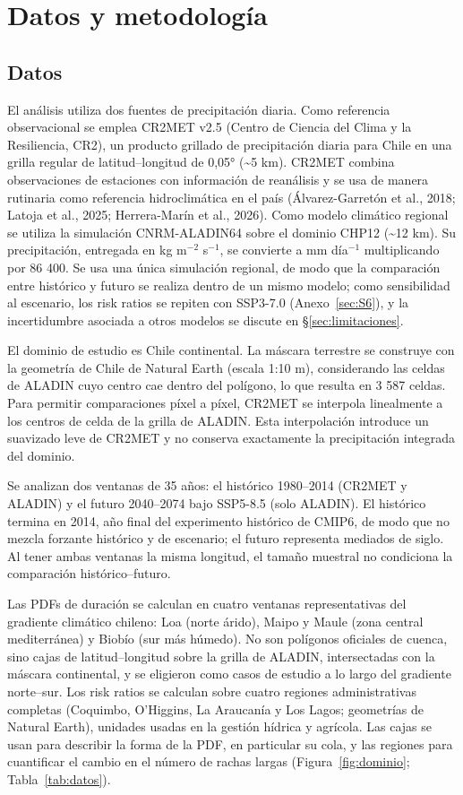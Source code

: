 \chapter{Datos y metodología}\label{cap:3}

\section{Datos}\label{sec:datos}

El análisis utiliza dos fuentes de precipitación diaria. Como referencia observacional se emplea CR2MET v2.5 (Centro de Ciencia del Clima y la Resiliencia, CR2), un producto grillado de precipitación diaria para Chile en una grilla regular de latitud--longitud de 0,05° (\textasciitilde5 km). CR2MET combina observaciones de estaciones con información de reanálisis y se usa de manera rutinaria como referencia hidroclimática en el país (Álvarez-Garretón et al., 2018; Latoja et al., 2025; Herrera-Marín et al., 2026). Como modelo climático regional se utiliza la simulación CNRM-ALADIN64 sobre el dominio CHP12 (\textasciitilde12 km). Su precipitación, entregada en kg m$^{-2}$ s$^{-1}$, se convierte a mm día$^{-1}$ multiplicando por 86 400. Se usa una única simulación regional, de modo que la comparación entre histórico y futuro se realiza dentro de un mismo modelo; como sensibilidad al escenario, los risk ratios se repiten con SSP3-7.0 (Anexo~\ref{sec:S6}), y la incertidumbre asociada a otros modelos se discute en §\ref{sec:limitaciones}.

El dominio de estudio es Chile continental. La máscara terrestre se construye con la geometría de Chile de Natural Earth (escala 1:10 m), considerando las celdas de ALADIN cuyo centro cae dentro del polígono, lo que resulta en 3 587 celdas. Para permitir comparaciones píxel a píxel, CR2MET se interpola linealmente a los centros de celda de la grilla de ALADIN. Esta interpolación introduce un suavizado leve de CR2MET y no conserva exactamente la precipitación integrada del dominio.

Se analizan dos ventanas de 35 años: el histórico 1980--2014 (CR2MET y ALADIN) y el futuro 2040--2074 bajo SSP5-8.5 (solo ALADIN). El histórico termina en 2014, año final del experimento histórico de CMIP6, de modo que no mezcla forzante histórico y de escenario; el futuro representa mediados de siglo. Al tener ambas ventanas la misma longitud, el tamaño muestral no condiciona la comparación histórico--futuro.

Las PDFs de duración se calculan en cuatro ventanas representativas del gradiente climático chileno: Loa (norte árido), Maipo y Maule (zona central mediterránea) y Biobío (sur más húmedo). No son polígonos oficiales de cuenca, sino cajas de latitud--longitud sobre la grilla de ALADIN, intersectadas con la máscara continental, y se eligieron como casos de estudio a lo largo del gradiente norte--sur. Los risk ratios se calculan sobre cuatro regiones administrativas completas (Coquimbo, O'Higgins, La Araucanía y Los Lagos; geometrías de Natural Earth), unidades usadas en la gestión hídrica y agrícola. Las cajas se usan para describir la forma de la PDF, en particular su cola, y las regiones para cuantificar el cambio en el número de rachas largas (Figura~\ref{fig:dominio}; Tabla~\ref{tab:datos}).

